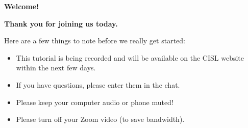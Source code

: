 \begin{frame}{\textbf{Welcome!}}

  \centerline{\textbf{Thank you for joining us today.}}
  \vspace{3em}

  Here are a few things to note before we really get started:
  \begin{itemize}
    \item This tutorial is being recorded and will be available on the CISL website within the next few days.
    \item If you have questions, please enter them in the chat.
    \item Please keep your computer audio or phone muted!
    \item Please turn off your Zoom video (to save bandwidth).
  \end{itemize}
\end{frame}
